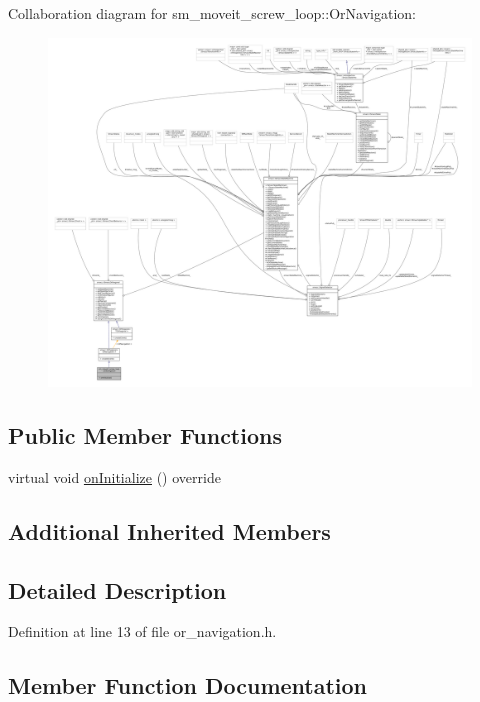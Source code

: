 Collaboration diagram for sm\+\_\+moveit\+\_\+screw\+\_\+loop\+:\+:Or\+Navigation\+:
\nopagebreak
\begin{figure}[H]
\begin{center}
\leavevmode
\includegraphics[width=350pt]{classsm__moveit__screw__loop_1_1OrNavigation__coll__graph}
\end{center}
\end{figure}
\subsection*{Public Member Functions}
\begin{DoxyCompactItemize}
\item 
virtual void \hyperlink{classsm__moveit__screw__loop_1_1OrNavigation_a38ef8156aba6284ed69c50880cef4f33}{on\+Initialize} () override
\end{DoxyCompactItemize}
\subsection*{Additional Inherited Members}


\subsection{Detailed Description}


Definition at line 13 of file or\+\_\+navigation.\+h.



\subsection{Member Function Documentation}
\mbox{\label{classsm__moveit__screw__loop_1_1OrNavigation_a38ef8156aba6284ed69c50880cef4f33}} 
